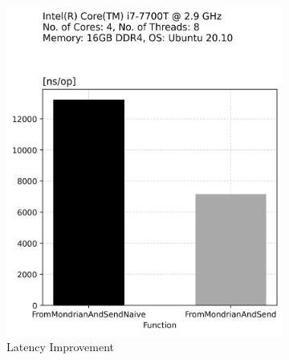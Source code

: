 \begin{figure}[t]
    \centering
    \begin{subfigure}[t]{.22\textwidth}
      \centering
      \includegraphics[width=\linewidth]{img/from_mondrian_and_send_opt_time.png}
      \caption{Latency Improvement}
      \label{fig:sub2: Latency Improvement}
    \end{subfigure}\hfill%
    \begin{subfigure}[t]{.22\textwidth}
      \centering

\end{subfigure}
\end{figure}
